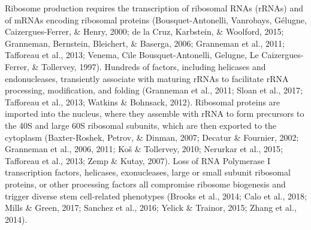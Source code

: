 \documentclass[12pt,oneside]{reedthesis}
\begin{document}
Ribosome production requires the transcription of ribosomal RNAs (rRNAs)
and of mRNAs encoding ribosomal proteins (Bousquet-Antonelli, Vanrobays, Gélugne, Caizergues-Ferrer, \& Henry, 2000; de la Cruz, Karbstein, \& Woolford, 2015; Granneman, Bernstein, Bleichert, \& Baserga, 2006; Granneman et al., 2011; Tafforeau et al., 2013; Venema, Cile Bousquet-Antonelli, Gelugne, Le Caizergues-Ferrer, \& Tollervey, 1997). Hundreds of factors,
including helicases and endonucleases, transiently associate with
maturing rRNAs to facilitate rRNA processing, modification, and folding
(Granneman et al., 2011; Sloan et al., 2017; Tafforeau et al., 2013; Watkins \& Bohnsack, 2012).
Ribosomal proteins are imported into the nucleus, where they assemble
with rRNA to form precursors to the 40S and large 60S ribosomal
subunits, which are then exported to the cytoplasm
(Baxter-Roshek, Petrov, \& Dinman, 2007; Decatur \& Fournier, 2002; Granneman et al., 2006, 2011; Koš \& Tollervey, 2010; Nerurkar et al., 2015; Tafforeau et al., 2013; Zemp \& Kutay, 2007). Loss of RNA Polymerase I transcription
factors, helicases, exonucleases, large or small subunit ribosomal
proteins, or other processing factors all compromise ribosome biogenesis
and trigger diverse stem cell-related phenotypes (Brooks et al., 2014; Calo et al., 2018; Mills \& Green, 2017; Sanchez et al., 2016; Yelick \& Trainor, 2015; Zhang et al., 2014).
\end{document}
